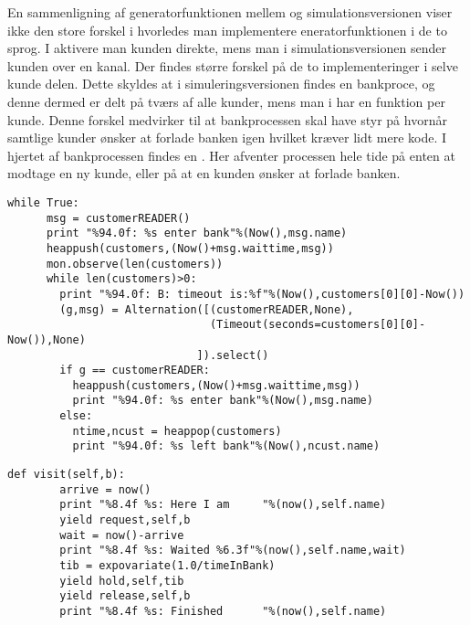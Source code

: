 En sammenligning af generatorfunktionen mellem \simpy og simulationsversionen viser ikke den store forskel i hvorledes  man  implementere eneratorfunktionen i de to sprog. I \simpy aktivere man kunden direkte, mens man i simulationsversionen sender kunden over en kanal. Der findes større forskel på de to implementeringer i selve kunde delen. Dette skyldes at i simuleringsversionen findes en bankproce, og denne dermed er delt på tværs af alle kunder, mens man i \simpy har en funktion per kunde. Denne forskel medvirker til at bankprocessen skal have styr på hvornår samtlige kunder ønsker at forlade banken igen hvilket kræver lidt mere kode. I hjertet af bankprocessen findes en . Her afventer processen hele tide på enten at modtage en ny kunde, eller på at en kunden ønsker at forlade banken.

\begin{lstlisting}[firstnumber=39,float=hbtp, label=fig:simulation_bank, caption= Uddrag af bank processen i simulation]
    while True:
      msg = customerREADER()
      print "%94.0f: %s enter bank"%(Now(),msg.name)
      heappush(customers,(Now()+msg.waittime,msg))
      mon.observe(len(customers))
      while len(customers)>0:
        print "%94.0f: B: timeout is:%f"%(Now(),customers[0][0]-Now())
        (g,msg) = Alternation([(customerREADER,None),
                               (Timeout(seconds=customers[0][0]- Now()),None)
                             ]).select()
        if g == customerREADER:
          heappush(customers,(Now()+msg.waittime,msg))
          print "%94.0f: %s enter bank"%(Now(),msg.name)
        else:
          ntime,ncust = heappop(customers)
          print "%94.0f: %s left bank"%(Now(),ncust.name) 
\end{lstlisting}

\begin{lstlisting}[firstnumber=20 ,float=hbtp, label=fig:simpy_customer, caption=funktionen \code{visit} i \simpy]
     def visit(self,b):                                
        arrive = now()
        print "%8.4f %s: Here I am     "%(now(),self.name)
        yield request,self,b                          
        wait = now()-arrive
        print "%8.4f %s: Waited %6.3f"%(now(),self.name,wait)
        tib = expovariate(1.0/timeInBank)            
        yield hold,self,tib                          
        yield release,self,b                         
        print "%8.4f %s: Finished      "%(now(),self.name)
\end{lstlisting}


